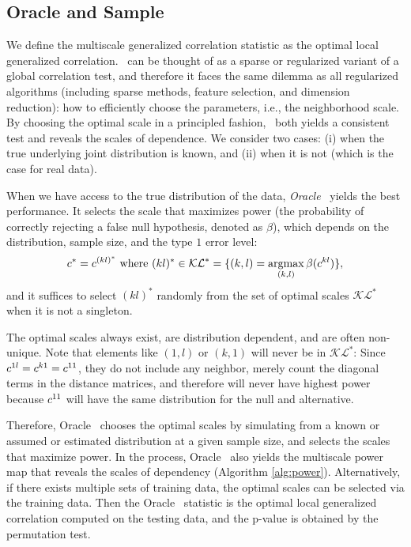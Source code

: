 \documentclass[11pt]{extarticle}
\begin{document}
\subsection{Oracle and Sample \Mgc}
\label{appen:mgc2}

We define the multiscale generalized correlation statistic as the optimal local generalized correlation.
\Mgc~can be thought of as a sparse or regularized variant of a global correlation test, and therefore it faces the same dilemma as all regularized algorithms (including sparse methods, feature selection, and dimension reduction): how to efficiently choose the parameters, i.e., the neighborhood scale. By choosing the optimal scale in a principled fashion, \Mgc~both yields a consistent test and reveals the scales of dependence.  We consider two cases: (i) when the true underlying joint distribution is known, and (ii) when it is not (which is the case for real data).

When we have access to the true distribution of the data, \emph{Oracle} \Mgc~yields the best performance. It selects the scale that maximizes power (the probability of correctly rejecting a false null hypothesis, denoted as $\beta$), which depends on the distribution, sample size, and the type $1$ error level:
\begin{align} \label{eq:popc}
\GG^{*} =  c^{(kl)^*}   \text{ where } (kl)^* \in \mathcal{KL}^* =\{(k,l)=\argmax_{(k,l)}\beta(\GG^{kl})\}, %
\end{align}
and it suffices to select $(kl)^*$ randomly from the set of optimal scales $\mathcal{KL}^*$ when it is not a singleton.

The optimal scales always exist, are distribution dependent, and are often non-unique. Note that elements like $(1,l)$ or $(k,1)$ will never be in $\mathcal{KL}^*$: Since $c^{1l}=c^{k1}=c^{11}$, they do not include any neighbor, merely count the diagonal terms in the distance matrices, and therefore will never have highest power because $c^{11}$ will have the same distribution for the null and alternative.

Therefore, Oracle \Mgc~chooses the optimal scales by simulating from a known or assumed or estimated distribution at a given sample size, and selects the scales that maximize power. In the process, Oracle \Mgc~also yields the multiscale power map that reveals the scales of dependency (Algorithm \ref{alg:power}). Alternatively, if there exists multiple sets of training data, the optimal scales can be selected via the training data. Then the Oracle \Mgc~statistic is the optimal local generalized correlation computed on the testing data, and the p-value is obtained by the permutation test.
\end{document}
